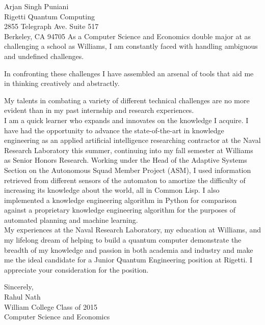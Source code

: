 \documentclass[11pt]{letter} %
\newcommand{\forceindent}{\leavevmode{\parindent=24pt\indent}}
\begin{document}
\begin{letter}{Arjan Singh Puniani \\
Rigetti Quantum Computing \\
2855 Telegraph Ave. Suite 517\\
Berkeley, CA 94705}
As a Computer Science and Economics double major at as challenging a school as Williams, I am constantly faced with handling ambiguous and undefined challenges. 

In confronting these challenges I have assembled an arsenal of tools that aid me in thinking creatively and abstractly. 

My talents in combating a variety of different technical challenges are no more evident than in my past internship and research experiences. \\

\forceindent I am a quick learner who expands and innovates on the knowledge I acquire. I have had the opportunity to advance the state-of-the-art in knowledge engineering as an applied artificial intelligence researching contractor at the Naval Research Laboratory this summer, continuing into my fall semester at Williams as Senior Honors Research. Working under the Head of the Adaptive Systems Section on the Autonomous Squad Member Project (ASM), I used information retrieved from different sensors of the automaton to amortize the difficulty of increasing its knowledge about the world, all in Common Lisp. I also implemented a knowledge engineering algorithm in Python for comparison against a proprietary knowledge engineering algorithm for the purposes of automated planning and machine learning. \\

\forceindent My experiences at the Naval Research Laboratory, my education at Williams, and my lifelong dream of helping to build a quantum computer demonstrate the breadth of my knowledge and passion in both academia and industry and make me the ideal candidate for a Junior Quantum Engineering position at Rigetti. I appreciate your consideration for the position. 

\closing{Sincerely,\\
Rahul Nath \\
William College Class of 2015  \\
Computer Science and Economics}


\end{letter}
\end{document}
